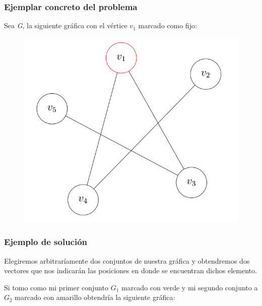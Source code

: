 \documentclass{article}
\begin{document}
\subsubsection*{Ejemplar concreto del problema}
Sea \textit{G}, la siguiente gráfica con el vértice $v_1$ marcado como 
fijo:
\begin{figure}[h]
\begin{center}
\includegraphics[scale=0.25]{./img/graphExample}
\end{center}
\end{figure}
\subsubsection*{Ejemplo de solución}
Elegiremos arbitraríamente dos conjuntos de nuestra gráfica y 
obtendremos dos vectores que nos indicarán las posiciones en donde se
encuentran dichos elemento.

Si tomo como mi primer conjunto $G_1$ marcado con verde y mi 
segundo conjunto a $G_2$ marcado con amarillo obtendría la 
siguiente gráfica:
\end{document}
